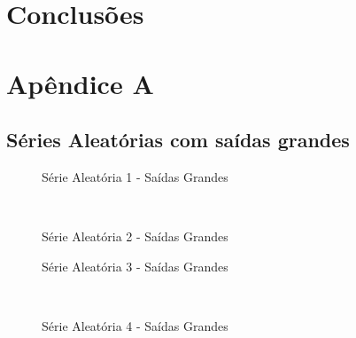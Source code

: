 \documentclass[12pt]{article}
\begin{document}
\section{Conclusões}

\section{Apêndice A}

\subsection{Séries Aleatórias com saídas grandes}
\clearpage
\begin{figure}
\begin{center}

\caption{Série Aleatória 1 - Saídas Grandes}
\label{1-large-random}
\end{center}
\end{figure}

\begin{figure}
\begin{center}
\\
\caption{Série Aleatória 2 - Saídas Grandes}
\label{2-large-random}
\end{center}
\end{figure}



\begin{figure}
\begin{center}

\caption{Série Aleatória 3 - Saídas Grandes}
\label{3-large-random}
\end{center}

\end{figure}

\begin{figure}
\begin{center}
 \\
\caption{Série Aleatória 4 - Saídas Grandes}
\label{4-large-random}
\end{center}
\end{figure}
\end{document}
